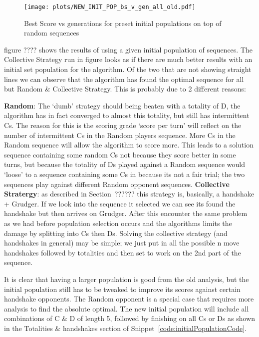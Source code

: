 \begin{figure}[ht] 
    \texttt{[image: plots/NEW\_INIT\_POP\_bs\_v\_gen\_all\_old.pdf]}
    \caption{Best Score vs generations for preset initial populations on top of random sequences}\label{fig:NEW-INIT-POP-bs-v-gen-all}
\end{figure}

figure ???? shows the results of using a given initial population of sequences.
The Collective Strategy run in figure looks as if there are much better results with an initial set population for the algorithm. 
Of the two that are not showing straight lines we can observe that the algorithm has found the optimal sequence for all but Random \& Collective Strategy. 
This is probably due to 2 different reasons:

    \textbf{Random}: The `dumb' strategy should being beaten with a totality of D, the algorithm has in fact converged to almost this totality, but still has intermittent Cs. 
    The reason for this is the scoring grade `score per turn' will reflect on the number of intermittent Cs in the Random players sequence. More Cs in the Random sequence will allow the algorithm to score more. This leads to a solution sequence containing some random Cs not because they score better in some turns, but because the totality of Ds played against a Random sequence would `loose' to a sequence containing some Cs in because its not a fair trial; the two sequences play against different Random opponent sequences.
    \textbf{Collective Stratergy}: as described in Section~?????? this strategy is, basically, a handshake + Grudger. If we look into the sequence it selected we can see its found the handshake but then arrives on Grudger. After this encounter the same problem as we had before population selection occurs and the algorithms limits the damage by splitting into Cs then Ds. Solving the collective strategy (and handshakes in general) may be simple; we just put in all the possible n move handshakes followed by totalities and then set to work on the 2nd part of the sequence.

It is clear that having a larger population is good from the old analysis, but the initial population still has to be tweaked to improve its scores against certain handshake opponents. 
The Random opponent is a special case that requires more analysis to find the absolute optimal. 
The new initial population will include all combinations of C \& D of length 5, followed by finishing on all Cs or Ds as shown in the Totalities \& handshakes section of Snippet~\ref{code:initialPopulationCode}. 

